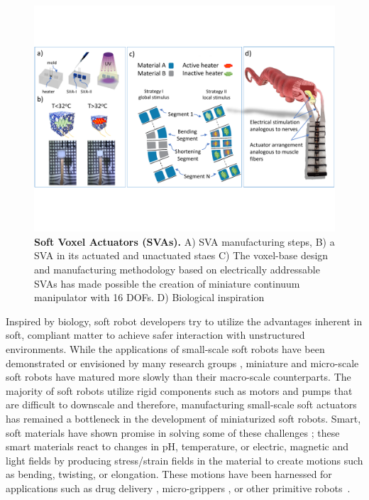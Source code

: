 \section{}
\begin{figure}[t]
      \centering
      \includegraphics[width=\textwidth]{concept4.pdf}
      \caption[]{\textbf{Soft Voxel Actuators (SVAs).} A) SVA manufacturing steps, B) a SVA in its actuated and unactuated staes C) The voxel-base design and manufacturing methodology based on electrically addressable SVAs has made possible the creation of miniature continuum manipulator with 16 DOFs. D) Biological inspiration}
      \label{fig:conceptSVA}
\end{figure}
Inspired by biology, soft robot developers try to utilize the advantages inherent in soft, compliant matter to achieve safer interaction with unstructured environments.  
While the applications of small-scale soft robots have been demonstrated or envisioned by many research groups \cite{Hines2017}, miniature and micro-scale soft robots have matured more slowly than their  macro-scale counterparts. The majority of soft robots utilize rigid components such as motors and pumps that are difficult to downscale \cite{Majidi2019} and therefore, manufacturing small-scale soft actuators has remained a bottleneck in the development of miniaturized soft robots. Smart, soft materials have shown promise in solving some of these challenges \cite{Steele2018, Stuart2010, White2013}; these smart materials react to changes in pH, temperature, or electric, magnetic and light fields by producing stress/strain fields in the material to create motions such as bending, twisting, or elongation. These motions have been harnessed for applications such as drug delivery \cite{ghosh2017}, micro-grippers \cite{shintake2018}, or other primitive robots~\cite{Ionov2014}. %
